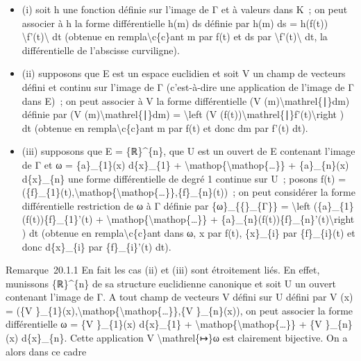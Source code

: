 \documentclass[]{article}
\begin{document}
\begin{itemize}
\itemsep1pt\parskip0pt
\item
  (i) soit h une fonction définie sur l'image de Γ et à valeurs dans K~;
  on peut associer à h la forme différentielle h(m) ds définie par h(m)
  ds = h(f(t)) \textbackslash{}\textbar{}f'(t)\textbackslash{}\textbar{}
  dt (obtenue en rempla\textbackslash{}c\{c\}ant m par f(t) et ds par
  \textbackslash{}\textbar{}f'(t)\textbackslash{}\textbar{} dt, la
  différentielle de l'abscisse curviligne).
\item
  (ii) supposons que E est un espace euclidien et soit V un champ de
  vecteurs défini et continu sur l'image de Γ (c'est-à-dire une
  application de l'image de Γ dans E)~; on peut associer à V la forme
  différentielle (V (m)\textbackslash{}mathrel\{∣\}dm) définie par (V
  (m)\textbackslash{}mathrel\{∣\}dm) = \textbackslash{}left (V
  (f(t))\textbackslash{}mathrel\{∣\}f'(t)\textbackslash{}right ) dt
  (obtenue en rempla\textbackslash{}c\{c\}ant m par f(t) et donc dm par
  f'(t) dt).
\item
  (iii) supposons que E = \{ℝ\}\^{}\{n\}, que U est un ouvert de E
  contenant l'image de Γ et ω = \{a\}\_\{1\}(x) d\{x\}\_\{1\} +
  \textbackslash{}mathop\{\textbackslash{}mathop\{\ldots{}\}\} +
  \{a\}\_\{n\}(x) d\{x\}\_\{n\} une forme différentielle de degré 1
  continue sur U~; posons f(t) =
  (\{f\}\_\{1\}(t),\textbackslash{}mathop\{\textbackslash{}mathop\{\ldots{}\}\},\{f\}\_\{n\}(t))~;
  on peut considérer la forme différentielle restriction de ω à Γ
  définie par \{ω\}\_\{\{\textbar{}\}\_\{Γ\}\} = \textbackslash{}left
  (\{a\}\_\{1\}(f(t))\{f\}\_\{1\}'(t) +
  \textbackslash{}mathop\{\textbackslash{}mathop\{\ldots{}\}\} +
  \{a\}\_\{n\}(f(t))\{f\}\_\{n\}'(t)\textbackslash{}right ) dt (obtenue
  en rempla\textbackslash{}c\{c\}ant dans ω, x par f(t), \{x\}\_\{i\}
  par \{f\}\_\{i\}(t) et donc d\{x\}\_\{i\} par \{f\}\_\{i\}'(t) dt).
\end{itemize}

Remarque~20.1.1 En fait les cas (ii) et (iii) sont étroitement liés. En
effet, munissons \{ℝ\}\^{}\{n\} de sa structure euclidienne canonique et
soit U un ouvert contenant l'image de Γ. A tout champ de vecteurs V
défini sur U défini par V (x) = (\{V
\}\_\{1\}(x),\textbackslash{}mathop\{\textbackslash{}mathop\{\ldots{}\}\},\{V
\}\_\{n\}(x)), on peut associer la forme différentielle ω = \{V
\}\_\{1\}(x) d\{x\}\_\{1\} +
\textbackslash{}mathop\{\textbackslash{}mathop\{\ldots{}\}\} + \{V
\}\_\{n\}(x) d\{x\}\_\{n\}. Cette application V
\textbackslash{}mathrel\{↦\}ω est clairement bijective. On a alors dans
ce cadre
\end{document}
